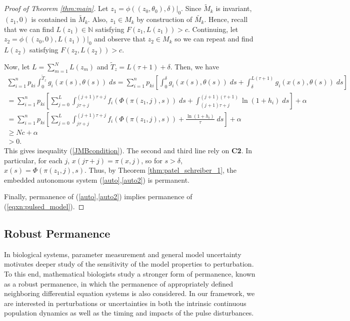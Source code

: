 \documentclass{article}
\theoremstyle{definition}
\newcommand{\R}{{\mathbb{R}}}
\newcommand{\N}{{\mathbb{N}}}
\begin{document}
\begin{proof}[Proof of Theorem \ref{thm:main}]
   Let $z_1 = \phi((z_0, \theta_0), \delta)|_0.
   $
   Since $\tilde{M}_k$ is invariant, $(z_1,0)$ is contained in $\tilde{M}_k$. Also, $z_1 \in M_k$ by construction of $\tilde{M_k}$. Hence, recall that we can find $L(z_1) \in \N$ satisfying $F(z_1,L(z_1)) > c$. 
Continuing, let $z_2 = \phi((z_0, 0), L(z_1))|_0$ and observe that $z_2 \in M_k$ so we can repeat and find $L(z_2)$ satisfying $F(z_2, L(z_2))>c.$ 
   
    Now, let $L = \sum^N_{m = 1} L(z_m)$ and $\tilde{T}_z = L(\tau + 1) + \delta$. Then, we have
    \begin{equation*}
        \begin{split}
           \sum^n_{i=1} p_{ki} \int_0^{\tilde{T}_z} g_i(x(s),\theta(s)) \; ds  = \sum^n_{i=1} p_{ki} \left[\int_0^\delta g_i(x(s),\theta(s)) \; ds + \int_\delta^{L(\tau + 1)} g_i(x(s),\theta(s)) \; ds \right]\\
            = \sum^n_{i=1} p_{ki} \left[\sum^{L}_{j=0} \int^{(j+1)\tau + j}_{j\tau + j} f_i(\Phi(\pi(z_1, j),s)) \;ds + \int^{(j+1)(\tau + 1)}_{(j+1)\tau + j} \ln{(1+h_i)} \;ds\right] + \alpha\\
            = \sum^n_{i=1} p_{ki} \left[ \sum^{L}_{j=0} \int^{(j+1)\tau + j}_{j\tau + j} f_i(\Phi(\pi(z_1, j),s)) + \frac{\ln{(1+h_i)}}{\tau} \; ds\right] + \alpha\\
            \geq Nc + \alpha \\
            > 0.
        \end{split}
    \end{equation*}
    This gives inequality (\ref{JMBcondition}).  The second and third line rely on \textbf{C2}. In particular, for each $j$, $x(j\tau + j) = \pi(x,j)$, so for $s > \delta$, $x(s) = \Phi(\pi(z_1, j), s)$.
    Thus, by Theorem \ref{thm:patel_schreiber_1}, the embedded autonomous system (\ref{auto},\ref{auto2}) is permanent.

Finally, permanence of (\ref{auto},\ref{auto2}) implies permanence of (\ref{eqxn:pulsed_model}).
  
\end{proof}



\subsection{Robust Permanence}
In biological systems, parameter measurement and general model uncertainty motivates deeper study of the sensitivity of the model properties to perturbation. To this end, mathematical biologists study a stronger form of permanence, known as a robust permanence, in which the permanence of appropriately defined neighboring differential equation systems is also considered.
In our framework, we are interested in perturbations or uncertainties in both the intrinsic continuous population dynamics as well as the timing and impacts of the pulse disturbances.
\end{document}
